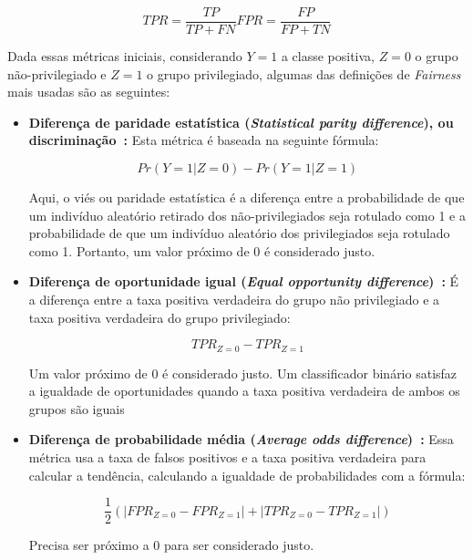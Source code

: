 \documentclass[twocolumn]{article}
\begin{document}
\begin{equation}
TPR = \frac{TP}{TP + FN}
FPR = \frac{FP}{FP + TN}
\end{equation}

Dada essas métricas iniciais, considerando $Y=1$ a classe positiva, $Z=0$ o grupo não-privilegiado e $Z=1$ o grupo privilegiado, algumas das definições de \textit{Fairness} mais usadas são as seguintes:

\begin{itemize}
\item \textbf{Diferença de paridade estatística (\textit{Statistical parity difference}), ou discriminação~\citep{Zemel_2013}:} Esta métrica é baseada na seguinte fórmula:

\begin{equation}
Pr(Y=1|Z=0)-Pr(Y=1|Z=1)
\end{equation}
 
Aqui, o viés ou paridade estatística é a diferença entre a probabilidade de que um indivíduo aleatório retirado dos não-privilegiados seja rotulado como 1 e a probabilidade de que um indivíduo aleatório dos privilegiados seja rotulado como 1. Portanto, um valor próximo de 0 é considerado justo.

\item \textbf{Diferença de oportunidade igual (\textit{Equal opportunity difference})~\citep{Biswas_2020}:} É a diferença entre a taxa positiva verdadeira do grupo não privilegiado e a taxa positiva verdadeira do grupo privilegiado:

\begin{equation}
TPR_{Z=0} - TPR_{Z=1}
\end{equation}
 
Um valor próximo de 0 é considerado justo. Um classificador binário satisfaz a igualdade de oportunidades quando a taxa positiva verdadeira de ambos os grupos são iguais~\citep{Hardt_2016}

\item \textbf{Diferença de probabilidade média (\textit{Average odds difference})~\citep{Biswas_2020}:} Essa métrica usa a taxa de falsos positivos e a taxa positiva verdadeira para calcular a tendência, calculando a igualdade de probabilidades com a fórmula:

\begin{equation}
\frac{1}{2}(|FPR_{Z=0} - FPR_{Z=1}|+|TPR_{Z=0} - TPR_{Z=1}|)
\end{equation}
 
Precisa ser próximo a 0 para ser considerado justo.


\end{itemize}
\end{document}
